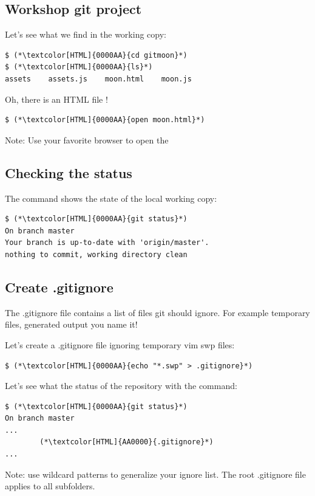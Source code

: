 \subsection{Workshop git project}
\begin{frame}[fragile]
  \subslidetitle
  Let's see what we find in the working copy:
  \begin{lstlisting}
$ (*\textcolor[HTML]{0000AA}{cd gitmoon}*)
$ (*\textcolor[HTML]{0000AA}{ls}*)
assets    assets.js    moon.html    moon.js
\end{lstlisting}

  \vspace{1em}
  Oh, there is an HTML file !
  \begin{lstlisting}
$ (*\textcolor[HTML]{0000AA}{open moon.html}*)
\end{lstlisting}

Note: Use your favorite browser to open the 
\end{frame}

\subsection{Checking the status}
\begin{frame}[fragile]
  \subslidetitle

  The command  shows the state of the local working copy:
  \begin{lstlisting}
$ (*\textcolor[HTML]{0000AA}{git status}*)
On branch master
Your branch is up-to-date with 'origin/master'.
nothing to commit, working directory clean
\end{lstlisting}
\end{frame}

\subsection{Create .gitignore}
\begin{frame}[fragile]
  \subslidetitle
  The .gitignore file contains a list of files git should ignore. For example temporary files, generated output you name it!

  \vspace{2em}
  Let's create a .gitignore file ignoring temporary vim swp files:
  \begin{lstlisting}
$ (*\textcolor[HTML]{0000AA}{echo "*.swp" > .gitignore}*)
\end{lstlisting}

  Let's see what the status of the repository with the  command:
  \begin{lstlisting}
$ (*\textcolor[HTML]{0000AA}{git status}*)
On branch master
...
        (*\textcolor[HTML]{AA0000}{.gitignore}*)
...
\end{lstlisting}

  \vspace{1em}
  Note: use wildcard patterns to generalize your ignore list. The root .gitignore file applies to all subfolders.

\end{frame}

